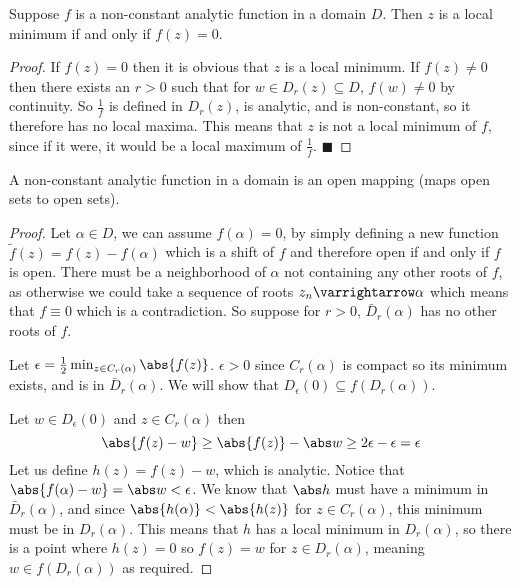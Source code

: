 \documentclass[10pt]{article}
\let\to=\varrightarrow
\def\qed{\hskip1cm\hbox{}\hfill$\blacksquare$}
\begin{document}
\begin{thrm*}

    Suppose $f$ is a non-constant analytic function in a domain $D$.
    Then $z$ is a local minimum if and only if $f(z)=0$.

\end{thrm*}

\begin{proof}

    If $f(z)=0$ then it is obvious that $z$ is a local minimum.
    If $f(z)\neq0$ then there exists an $r>0$ such that for $w\in D_r(z)\subseteq D$, $f(w)\neq0$ by continuity.
    So $\frac1f$ is defined in $D_r(z)$, is analytic, and is non-constant, so it therefore has no local maxima.
    This means that $z$ is not a local minimum of $f$, since if it were, it would be a local maximum of $\frac1f$.
    \qed

\end{proof}

\begin{thrm*}

    A non-constant analytic function in a domain is an open mapping (maps open sets to open sets).

\end{thrm*}

\begin{proof}

    Let $\alpha\in D$, we can assume $f(\alpha)=0$, by simply defining a new function $\tilde f(z)=f(z)-f(\alpha)$ which is a shift of $f$ and therefore open if and only if $f$ is open.
    There must be a neighborhood of $\alpha$ not containing any other roots of $f$, as otherwise we could take a sequence of roots $z_n\to\alpha$ which means that $f\equiv0$ which is a contradiction.
    So suppose for $r>0$, $\bar D_r(\alpha)$ has no other roots of $f$.

    Let $\epsilon=\frac12\min_{z\in C_r(\alpha)}\abs{f(z)}$.
    $\epsilon>0$ since $C_r(\alpha)$ is compact so its minimum exists, and is in $\bar D_r(\alpha)$.
    We will show that $D_\epsilon(0)\subseteq f(D_r(\alpha))$.

    Let $w\in D_\epsilon(0)$ and $z\in C_r(\alpha)$ then
    \[ \abs{f(z) - w} \geq \abs{f(z)} - \abs w \geq 2\epsilon - \epsilon = \epsilon \]
    Let us define $h(z)=f(z)-w$, which is analytic.
    Notice that $\abs{f(\alpha)-w}=\abs w<\epsilon$.
    We know that $\abs h$ must have a minimum in $\bar D_r(\alpha)$, and since $\abs{h(\alpha)}<\abs{h(z)}$ for $z\in C_r(\alpha)$, this minimum must be in $D_r(\alpha)$.
    This means that $h$ has a local minimum in $D_r(\alpha)$, so there is a point where $h(z)=0$ so $f(z)=w$ for $z\in D_r(\alpha)$, meaning $w\in f(D_r(\alpha))$ as required.

\end{proof}
\end{document}
